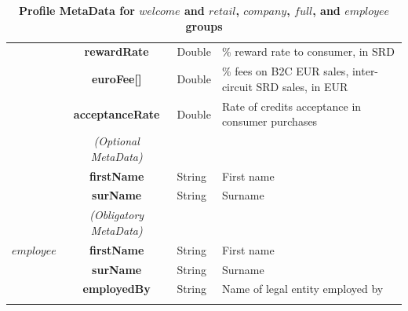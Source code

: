 \begin{table}[H]
\begin{centering}
{\begin{tabular}{ r | c | l | l }
			& {\bf rewardRate}			&Double	& \% reward rate to consumer, in SRD \\
			& {\bf euroFee[]}			&Double	& \% fees on B2C EUR sales, inter-circuit SRD sales, in EUR \\
			& {\bf acceptanceRate}		&Double	& Rate of credits acceptance in consumer purchases\\
\cline{2-2}
			 & \emph{(Optional MetaData)}& & \\
\cline{2-2}
			& {\bf firstName}			&String	& First name \\
			& {\bf surName}			&String	& Surname \\
\Xhline{1.5pt}
			& \emph{(Obligatory MetaData)} & & \\
\cline{2-2}
$employee$	& {\bf firstName}			&String	& First name \\
			& {\bf surName}			&String	& Surname \\
			& {\bf employedBy}			&String	& Name of legal entity employed by \\
\Xhline{1.5pt}
\end{tabular}
}
\caption{\small\textbf{Profile MetaData for $welcome$ and $retail$, $company$, $full$, and $employee$ groups}}
\label{tab:ProfileMetaData1}
\end{centering}
\end{table}


